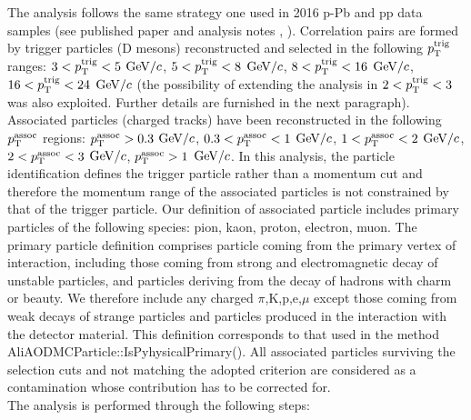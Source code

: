 The analysis follows the same strategy one used in 2016 p-Pb and pp data samples (see published paper \cite{ALICEDhcorr} and analysis notes \cite{Notepp}, \cite{NotepPb}). Correlation pairs are formed by
trigger particles (D mesons) reconstructed and selected in the following $p_{\rm T}^{\rm trig}$ ranges: $3<p_{\rm T}^{\rm trig}<5$ $\mathrm{GeV}/c$, $5<p_{\rm T}^{\rm trig}<8$ $\mathrm{GeV}/c$, $8<p_{\rm T}^{\rm trig}<16$ $\mathrm{GeV}/c$, $16<p_{\rm T}^{\rm trig}<24$ $\mathrm{GeV}/c$ (the possibility of extending the analysis in $2<p_{\rm T}^{\rm trig}<3$ was also exploited. Further details are furnished in the next paragraph). Associated particles (charged tracks) have been reconstructed in the following $p_{\rm T}^{\rm assoc}$ regions: $p_{\rm T}^{\rm assoc}>0.3$ $\mathrm{GeV}/c$, $0.3<p_{\rm T}^{\rm assoc}<1$ $\mathrm{GeV}/c$, $1<p_{\rm T}^{\rm assoc}<2$ $\mathrm{GeV}/c$, $2<p_{\rm T}^{\rm assoc}<3$ $\mathrm{GeV}/c$, $p_{\rm T}^{\rm assoc}>1$ $\mathrm{GeV}/c$. In this analysis, the particle identification defines the trigger particle rather than a momentum cut and therefore the momentum range of the associated particles is not constrained by that of the trigger particle. Our definition of associated particle includes primary particles of the following species: pion, kaon, proton, electron, muon. The primary particle definition comprises particle coming from the primary vertex of interaction, including those coming from strong and electromagnetic decay of unstable particles, and particles deriving from the decay of hadrons with charm or beauty.
We therefore include any charged $\pi$,K,p,e,$\mu$ except those coming from weak decays of strange particles and particles produced in the interaction with the detector material. This definition corresponds to that used in the method AliAODMCParticle::IsPyhysicalPrimary().
All associated particles surviving the selection cuts and not matching the adopted criterion are considered as a contamination whose contribution has to be corrected for. \\

The analysis is performed through the following steps:


